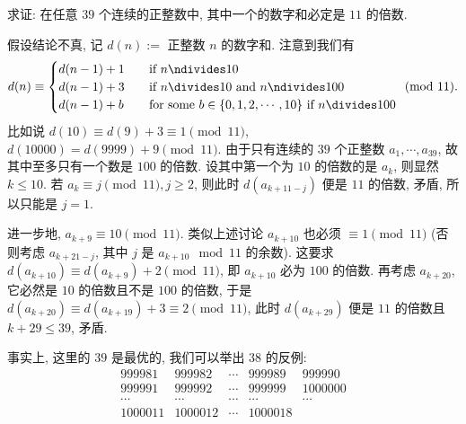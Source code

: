 \begin{prob}
\label{prob:prob-9}
求证: 在任意 $39$ 个连续的正整数中, 其中一个的数字和必定是 $11$ 的倍数.
\end{prob}

\begin{soln}
假设结论不真, 记 $d(n) :=$ 正整数 $n$ 的数字和. 注意到我们有
\begin{equation}
d(n) \equiv \begin{cases}
d(n-1) + 1 \quad &\text{if $n \ndivides 10$}\\
d(n-1) + 3 \quad &\text{if $n \divides 10$ and $n \ndivides 100$}\\
d(n-1) + b \quad &\text{for some $b \in \{0,1,2,\cdots,10\}$ if $n \divides 100$}
\end{cases} \pmod{11}.
\end{equation}
比如说 $d(10) \equiv d(9) + 3 \equiv 1 \pmod{11}$,
$d(10000) = d(9999) + 9 \pmod{11}$.
由于只有连续的 $39$ 个正整数 $a_1, \cdots, a_{39}$,
故其中至多只有一个数是 $100$ 的倍数.
设其中第一个为 $10$ 的倍数的是 $a_k$, 则显然 $k \le 10$.
若 $a_k \equiv j \pmod{11}, j \ge 2$, 则此时
$d(a_{k+11-j})$ 便是 $11$ 的倍数, 矛盾, 所以只能是 $j = 1$.

\bigskip

进一步地, $a_{k+9} \equiv 10 \pmod{11}$.
类似上述讨论 $a_{k+10}$ 也必须 $\equiv 1 \pmod{11}$
(否则考虑 $a_{k+21-j}$, 其中 $j$ 是 $a_{k+10} \mod 11$ 的余数).
这要求 $d(a_{k+10}) \equiv d(a_{k+9}) + 2 \pmod{11}$,
即 $a_{k+10}$ 必为 $100$ 的倍数. 再考虑 $a_{k+20}$,
它必然是 $10$ 的倍数且不是 $100$ 的倍数,
于是 $d(a_{k+20}) \equiv d(a_{k+19}) + 3 \equiv 2 \pmod{11}$,
此时 $d(a_{k+29})$ 便是 $11$ 的倍数且 $k + 29 \le 39$, 矛盾.
\end{soln}

\begin{rem*}
事实上, 这里的 $39$ 是最优的, 我们可以举出 $38$ 的反例:
\[
\begin{array}{lllll}
999981  & 999982  & \cdots & 999989 & 999990\\
999991  & 999992  & \cdots & 999999 & 1000000\\
\cdots  & \cdots  & \cdots & \cdots & \cdots \\
1000011 & 1000012 & \cdots & 1000018
\end{array}
\]
\end{rem*}
